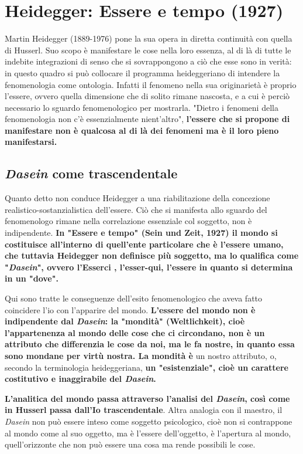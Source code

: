 \section{Heidegger: Essere e tempo (1927)}

Martin Heidegger (1889-1976) pone la sua opera in
diretta continuità con quella di Husserl. Suo scopo
è manifestare le cose nella loro essenza, al di là di
tutte le indebite integrazioni di senso che si sovrappongono a ciò che esse sono in verità: in questo quadro
si può collocare il programma heideggeriano di intendere
la fenomenologia come ontologia. Infatti il fenomeno
nella sua originarietà è proprio l'essere, ovvero quella dimensione
che di solito rimane nascosta, e a cui è perciò necessario
lo sguardo fenomenologico per mostrarla. "Dietro i
fenomeni della fenomenologia non c'è essenzialmente
nient'altro", \textbf{l'essere che si propone di manifestare non è
qualcosa al di là dei fenomeni ma è il loro pieno manifestarsi.}

\subsection{\textit{Dasein} come trascendentale}

Quanto detto non conduce Heidegger a una
riabilitazione della concezione realistico-sostanzialistica dell'essere. Ciò che si manifesta allo sguardo
del fenomenologo rimane nella correlazione
essenziale col soggetto, non è indipendente.
\textbf{In "Essere e tempo" (Sein und Zeit, 1927) il mondo
si costituisce all'interno di quell'ente particolare che
è l'essere umano, che tuttavia Heidegger non
definisce più soggetto, ma lo qualifica come
"\textit{Dasein}", ovvero l'Esserci , l'esser-qui, l'essere in
quanto si determina in un "dove".}

Qui sono tratte le
conseguenze dell'esito fenomenologico che aveva fatto
coincidere l'io con l'apparire del mondo.
\textbf{L'essere del mondo non è indipendente dal \textit{Dasein}: la
"mondità" (Weltlichkeit), cioè l'appartenenza al mondo
delle cose che ci circondano, non è un attributo che
differenzia le cose da noi, ma le fa nostre, in quanto
essa sono mondane per virtù nostra. La mondità è}
un nostro attributo, o, secondo la terminologia
heideggeriana, \textbf{un "esistenziale", cioè un carattere
costitutivo e inaggirabile del \textit{Dasein}.}


\textbf{L'analitica del mondo passa attraverso l'analisi del
\textit{Dasein}, così come in Husserl passa dall'Io
trascendentale}. Altra analogia con il maestro, il
\textit{Dasein} non può essere inteso come soggetto psicologico,
cioè non si contrappone al mondo come al suo oggetto,
ma è l'essere dell'oggetto, è l'apertura al mondo,
quell'orizzonte che non può essere una cosa ma
rende possibili le cose.

